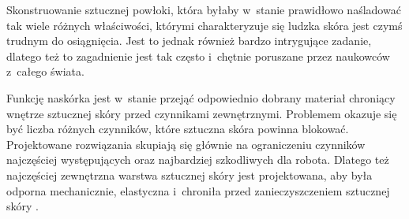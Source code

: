 



Skonstruowanie sztucznej powłoki, która byłaby w~stanie prawidłowo naśladować tak wiele różnych właściwości, którymi charakteryzuje się ludzka skóra jest czymś trudnym do osiągnięcia. Jest to jednak również bardzo intrygujące zadanie, dlatego też to zagadnienie jest tak często i~chętnie poruszane przez naukowców z~całego świata. 

Funkcję naskórka jest w~stanie przejąć odpowiednio dobrany materiał chroniący wnętrze sztucznej skóry przed czynnikami zewnętrznymi. Problemem okazuje się być liczba różnych czynników, które sztuczna skóra powinna blokować. Projektowane rozwiązania skupiają się głównie na ograniczeniu czynników najczęściej występujących oraz najbardziej szkodliwych dla robota. Dlatego też najczęściej zewnętrzna warstwa sztucznej skóry jest projektowana, aby była odporna mechanicznie, elastyczna i~chroniła przed zanieczyszczeniem sztucznej skóry \cite{b_article_wloch_4_wytrzymalosc, b_konf_kaczka_przekroj}.

